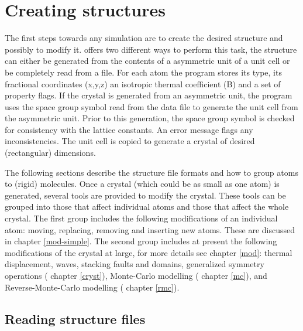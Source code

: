 
\chapter{Creating structures \label{struc}}

The first steps towards any simulation are to create the desired
structure and possibly to modify it.  \Discus offers two
different ways to perform this task, the structure can either be
generated from the contents of a asymmetric unit of a unit cell or
be completely read from a file.  For each atom the program stores
its type, its fractional coordinates (x,y,z) an isotropic
thermal coefficient (B) and a set of property flags. 
 If the crystal is generated from an
asymmetric unit, the program uses the space group symbol read from
the data file to generate the unit cell from the asymmetric unit.
Prior to this generation, the space group symbol is checked for
consistency with the lattice constants.  An error message flags any
inconsistencies.  The unit cell is copied to generate a crystal of
desired (rectangular) dimensions.
\par

The following sections describe the structure file formats and how
to group atoms to (rigid) molecules.  Once a crystal (which could be
as small as one atom) is generated, several tools are provided to
modify the crystal.  These tools can be grouped into those that
affect individual atoms and those that affect the whole crystal.
The first group includes the following modifications of an
individual atom: moving, replacing, removing and inserting new
atoms.  These are discussed in chapter \ref{mod-simple}.  The second
group includes at present the following modifications of the crystal
at large, for more details see chapter \ref{mod}: thermal
displacement, waves, stacking faults and domains, generalized 
symmetry operations ( chapter \ref{cryst}), Monte-Carlo modelling
( chapter \ref{mc}), and Reverse-Monte-Carlo modelling ( chapter 
\ref{rmc}).


\section{Reading structure files \label{struc-read}}

